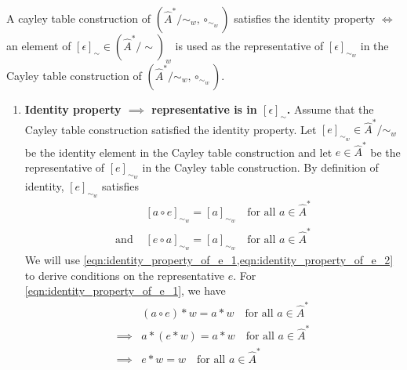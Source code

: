 \begin{propositionE}\label{prp:cayley_table_construction_satisfies_identity_iff_element_of_global_epsilon_used_as_representative}
    A cayley table construction of $(\hat{A}^{*}/\sim_{w}, \circ_{\sim_{w}})$ satisfies the identity property $\iff$ an element of $[\epsilon]_{\sim} \in (\hat{A}^{*}/\sim)_{w}$ is used as the representative of $[\epsilon]_{\sim_{w}}$ in the Cayley table construction of $(\hat{A}^{*}/\sim_{w}, \circ_{\sim_{w}})$.
\end{propositionE}
\begin{proofE}
\begin{enumerate}[(1)]
    \item \textbf{Identity property $\implies$ representative is in $[\epsilon]_{\sim}$.}
    Assume that the Cayley table construction satisfied the identity property.
    Let $[e]_{\sim_{w}} \in \hat{A}^{*}/\sim_{w}$ be the identity element in the Cayley table construction and let $e \in \hat{A}^{*}$ be the representative of $[e]_{\sim_{w}}$ in the Cayley table construction.
    By definition of identity, $[e]_{\sim_{w}}$ satisfies
    \begin{align}
        & [a \circ e]_{\sim_{w}} = [a]_{\sim_{w}}  \quad \text{for all $a \in \hat{A}^{*}$} \label{eqn:identity_property_of_e_1} \\
        \text{and } & [e \circ a]_{\sim_{w}} = [a]_{\sim_{w}} \quad \text{for all $a \in \hat{A}^{*}$} \label{eqn:identity_property_of_e_2}
    \end{align}
    We will use \cref{eqn:identity_property_of_e_1,eqn:identity_property_of_e_2} to derive conditions on the representative $e$.
    For \cref{eqn:identity_property_of_e_1}, we have
    \begin{align}
        & (a \circ e) \ast w = a \ast w \quad \text{for all $a \in \hat{A}^{*}$} \\
        \implies & a \ast (e \ast w) = a \ast w \quad \text{for all $a \in \hat{A}^{*}$} \\
        \implies & e \ast w = w \quad \text{for all $a \in \hat{A}^{*}$} \label{eqn:identity_condition_e_1}
    \end{align}
    

\end{enumerate}
\end{proofE}
